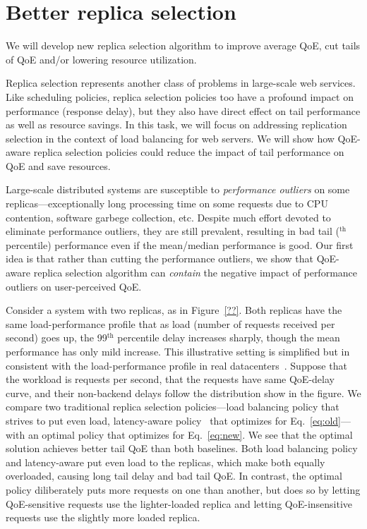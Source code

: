 \section{Better replica selection}
\begin{task}
We will develop new replica selection algorithm to improve average QoE, cut tails of QoE and/or lowering resource utilization.
\end{task}

Replica selection represents another class of problems in large-scale web services. 
Like scheduling policies, replica selection policies too have a profound impact on performance (response delay), but they also have direct effect on tail performance as well as resource savings.
In this task, we will focus on addressing replication selection in the context of load balancing for web servers. 
We will show how QoE-aware replica selection policies could reduce the impact of tail performance on QoE and save resources.

Large-scale distributed systems are susceptible to {\em performance outliers} on some replicas---\eg exceptionally long processing time on some requests due to CPU contention, software garbege collection, etc. 
Despite much effort devoted to eliminate performance outliers, they are still prevalent, resulting in bad tail ($^\textrm{th}$ percentile) performance even if the mean/median performance is good.
Our first idea is that rather than cutting the performance outliers, we show that QoE-aware replica selection algorithm can {\em contain} the negative impact of performance outliers on user-perceived QoE.

Consider a system with two replicas, as in Figure~\ref{??}. 
Both replicas have the same load-performance profile that as load (number of requests received per second) goes up, the 99$^\textrm{th}$ percentile delay increases sharply, though the mean performance has only mild increase. 
This illustrative setting is simplified but in consistent with the load-performance profile in real datacenters~\cite{??}.
Suppose that the workload is \fillme requests per second, that the requests have same QoE-delay curve, and their non-backend delays follow the distribution show in the figure.
We compare two traditional replica selection policies---load balancing policy that strives to put even load, latency-aware policy~\cite{c3,cassandra,etc} that optimizes for Eq.~\ref{eq:old}---with an optimal policy that optimizes for Eq.~\ref{eq:new}.
We see that the optimal solution achieves better tail QoE than both baselines. 
Both load balancing policy and latency-aware put even load to the replicas, which make both equally overloaded, causing long tail delay and bad tail QoE.
In contrast, the optimal policy diliberately puts more requests on one than another, but does so by letting QoE-sensitive requests use the lighter-loaded replica and letting QoE-insensitive requests use the slightly more loaded replica. 

